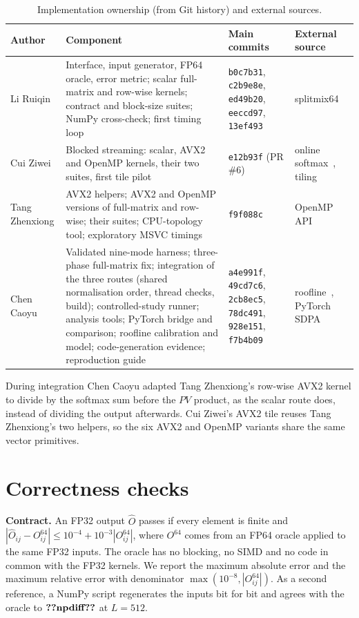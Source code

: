 \documentclass[11pt,a4paper]{article}
\makeatletter
\newcommand{\gpn}[1]{\ifcsname gpn@#1\endcsname\csname gpn@#1\endcsname\else\textbf{??#1??}\GenericWarning{}{Undefined number #1}\fi}
\newcommand{\code}[1]{\texttt{#1}}
\makeatother
\begin{document}
\begin{table}[!htbp]
\centering\small
\caption{Implementation ownership (from Git history) and external sources.}
\label{tab:owners}
\begin{tabularx}{\textwidth}{@{}l Y >{\raggedright\arraybackslash}p{3.1cm} >{\raggedright\arraybackslash}p{2.5cm}@{}}
\toprule
Author & Component & Main commits & External source \\
\midrule
Li Ruiqin & Interface, input generator, FP64 oracle, error metric; scalar full-matrix and row-wise kernels; contract and block-size suites; NumPy cross-check; first timing loop & \code{b0c7b31}, \code{c2b9e8e}, \code{ed49b20}, \code{eeccd97}, \code{13ef493} & splitmix64~\cite{steele2014} \\
Cui Ziwei & Blocked streaming: scalar, AVX2 and OpenMP kernels, their two suites, first tile pilot & \code{e12b93f} (PR \#6) & online softmax~\cite{milakov2018}, tiling~\cite{dao2022} \\
Tang Zhenxiong & AVX2 helpers; AVX2 and OpenMP versions of full-matrix and row-wise; their suites; CPU-topology tool; exploratory MSVC timings & \code{f9f088c} & OpenMP API~\cite{openmp52} \\
Chen Caoyu & Validated nine-mode harness; three-phase full-matrix fix; integration of the three routes (shared normalisation order, thread checks, build); controlled-study runner; analysis tools; PyTorch bridge and comparison; roofline calibration and model; code-generation evidence; reproduction guide & \code{a4e991f}, \code{49cd7c6}, \code{2cb8ec5}, \code{78dc491}, \code{928e151}, \code{f7b4b09} & roofline~\cite{williams2009}, PyTorch SDPA~\cite{pytorchsdpa} \\
\bottomrule
\end{tabularx}
\end{table}

During integration Chen Caoyu adapted Tang Zhenxiong's row-wise AVX2 kernel to divide by the softmax sum before the $PV$ product, as the scalar route does, instead of dividing the output afterwards. Cui Ziwei's AVX2 tile reuses Tang Zhenxiong's two helpers, so the six AVX2 and OpenMP variants share the same vector primitives.

\section{Correctness checks}\label{sec:correct}

\textbf{Contract.} An FP32 output $\hat O$ passes if every element is finite and $|\hat O_{ij}-O^{64}_{ij}|\le 10^{-4}+10^{-3}|O^{64}_{ij}|$, where $O^{64}$ comes from an FP64 oracle applied to the same FP32 inputs. The oracle has no blocking, no SIMD and no code in common with the FP32 kernels. We report the maximum absolute error and the maximum relative error with denominator $\max(10^{-8},|O^{64}_{ij}|)$. As a second reference, a NumPy script regenerates the inputs bit for bit and agrees with the oracle to $\gpn{npdiff}$ at $L=512$.
\end{document}
